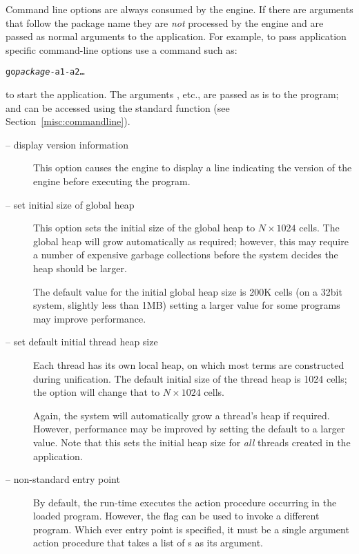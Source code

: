 Command line options are always consumed by the engine. If there are arguments that follow the package name they are \emph{not} processed by the engine and are passed as normal arguments to the \go application. For example, to pass application specific command-line options use a command such as:
\begin{alltt}
go \emph{package} -a1 -a2 \ldots
\end{alltt}
to start the \go application. The arguments ,  etc., are passed as is to the \go program; and can be accessed using the standard  function (see Section~\vref{misc:commandline}).

\begin{description}
\item[ -- display version information]

This option causes the engine to display a line indicating the version of the engine before executing the program.

\item[ -- set initial size of global heap]

This option sets the initial size of the global heap to $N\times1024$ cells. The global heap will grow automatically as required; however, this may require a number of expensive garbage collections before the system decides the heap should be larger.

The default value for the initial global heap size is 200K cells (on a 32bit system, slightly less than 1MB) setting a larger value for some programs may improve performance.

\item[ -- set default initial thread heap size]

Each thread has its own local heap, on which most terms are constructed during unification. The default initial size of the thread heap is 1024 cells; the  option will change that to $N\times1024$ cells.

Again, the system will automatically grow a thread's heap if required. However, performance may be improved by setting the default to a larger value. Note that this sets the initial heap size for \emph{all} threads created in the application.

\item[ -- non-standard entry point]

By default, the \go run-time executes the  action procedure occurring in the loaded program. However, the  flag can be used to invoke a different program. Which ever entry point is specified, it must be a single argument action procedure that takes a list of s as its argument.


\end{description}
